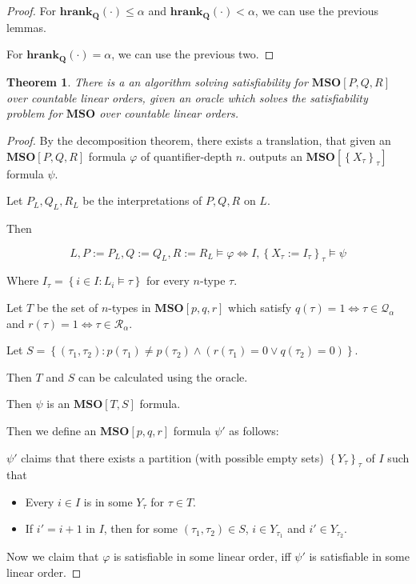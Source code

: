 \documentclass{article}
\newtheorem{theorem}{Theorem}
\newcommand{\braces}[1]{\left\{ {#1} \right\}}
\newcommand{\setcomp}[1]{\braces{#1}}
\newcommand{\hrank}[1]{\mathbf{hrank}_{\qq}\left( #1 \right)}
\newcommand{\mso}{\mathbf{MSO}}
\newcommand{\qq}{\mathbf{Q}}
\begin{document}
\begin{proof}
  For $\hrank{\cdot} \le \alpha$ and $\hrank{\cdot} < \alpha$, we can use the previous lemmas.

  For $\hrank{\cdot} = \alpha$, we can use the previous two.
\end{proof}

\begin{theorem}
  There is a an algorithm solving satisfiability for $\mso[P, Q, R]$ over countable linear orders,
  given an oracle which solves the satisfiability problem for $\mso$ over countable linear orders.
\end{theorem}

\begin{proof}
  By the decomposition theorem, there exists a translation,
  that given an $\mso[P, Q, R]$ formula $\varphi$ of quantifier-depth $n$.
  outputs an $\mso[\setcomp{X_\tau}_\tau]$ formula $\psi$.

  Let $P_L, Q_L, R_L$ be the interpretations of $P, Q, R$ on $L$.

  Then

  $$
    L, P := P_L, Q := Q_L, R := R_L \models \varphi \iff I, \setcomp{X_\tau := I_\tau}_\tau \models \psi
  $$

  Where $I_\tau = \setcomp{i \in I : L_i \models \tau}$ for every $n$-type $\tau$.

  Let $T$ be the set of $n$-types in $\mso[p, q, r]$ which satisfy
  $q(\tau) = 1 \iff \tau \in \mathcal{Q}_{\alpha}$ and $r(\tau) = 1 \iff \tau \in \mathcal{R}_{\alpha}$.

  Let $S = \setcomp{(\tau_1, \tau_2) : p(\tau_1) \ne p(\tau_2) \land (r(\tau_1) = 0 \lor q(\tau_2) = 0)}$.

  Then $T$ and $S$ can be calculated using the oracle.

  Then $\psi$ is an $\mso[T, S]$ formula.

  Then we define an $\mso[p, q, r]$ formula $\psi'$ as follows:

  $\psi'$ claims that there exists a partition (with possible empty sets) $\setcomp{Y_\tau}_{\tau}$ of $I$ such that
  \begin{itemize}
    \item Every $i \in I$ is in some $Y_\tau$ for $\tau \in T$.
    \item If $i' = i+1$ in $I$, then for some $(\tau_1, \tau_2) \in S$, $i \in Y_{\tau_1}$ and $i' \in Y_{\tau_2}$.
  \end{itemize}

  Now we claim that $\varphi$ is satisfiable in some linear order, iff $\psi'$ is satisfiable in some
  linear order.


\end{proof}
\end{document}
